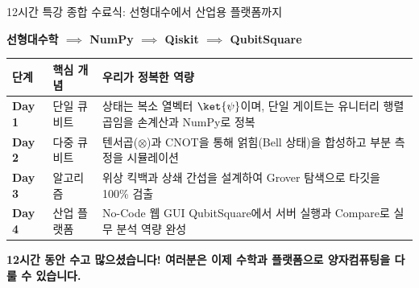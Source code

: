 \documentclass[aspectratio=169, 10pt]{beamer}
\begin{document}
\begin{frame}{12시간 특강 종합 수료식: 선형대수에서 산업용 플랫폼까지}
    \begin{center}
        \Large \color{qcDarkBlue} \textbf{선형대수학 $\implies$ NumPy $\implies$ Qiskit $\implies$ QubitSquare}
    \end{center}
    \vspace{0.1cm}
    \begin{table}
    \centering
    \scriptsize
    \begin{tabular}{llp{9.2cm}}
    \toprule
    \textbf{단계} & \textbf{핵심 개념} & \textbf{우리가 정복한 역량} \\
    \midrule
    \textbf{Day 1} & 단일 큐비트 & 상태는 복소 열벡터 $\ket{\psi}$이며, 단일 게이트는 유니터리 행렬곱임을 손계산과 NumPy로 정복 \\
    \textbf{Day 2} & 다중 큐비트 & 텐서곱($\otimes$)과 CNOT을 통해 얽힘(Bell 상태)을 합성하고 부분 측정을 시뮬레이션 \\
    \textbf{Day 3} & 알고리즘 & 위상 킥백과 상쇄 간섭을 설계하여 Grover 탐색으로 타깃을 100\% 검출 \\
    \textbf{Day 4} & 산업 플랫폼 & No-Code 웹 GUI QubitSquare에서 서버 실행과 Compare로 실무 분석 역량 완성 \\
    \bottomrule
    \end{tabular}
    \end{table}
    \vspace{0.2cm}
    \begin{center}
        \textbf{12시간 동안 수고 많으셨습니다! 여러분은 이제 수학과 플랫폼으로 양자컴퓨팅을 다룰 수 있습니다.}
    \end{center}
\end{frame}
\end{document}
